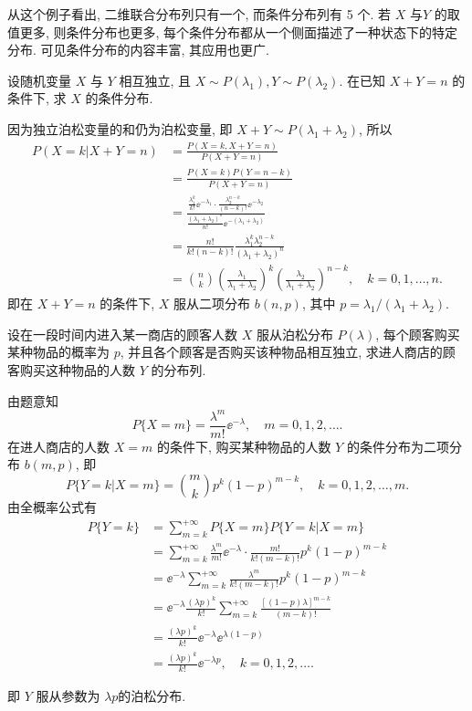 	从这个例子看出, 二维联合分布列只有一个, 而条件分布列有 5 个. 若 $X$ 与$Y$ 的取值更多, 则条件分布也更多, 
	每个条件分布都从一个侧面描述了一种状态下的特定分布. 可见条件分布的内容丰富, 其应用也更广.
	\begin{example}\label{exam:3.5.2}
		设随机变量 $X$ 与 $Y$ 相互独立, 且 $X\sim P(\lambda_1),Y\sim P(\lambda_2)$. 在已知 $X+Y=n$ 的条件下, 求 $X$ 的条件分布.
	\end{example}
	\begin{solution}
		因为独立泊松变量的和仍为泊松变量, 即 $X+Y\sim P(\lambda_1+\lambda_2)$, 所以
		\begin{align*}
			P(X=k | X+Y=n) &=\frac{P(X=k, X+Y=n)}{P(X+Y=n)} \\
			&=\frac{P(X=k) P(Y=n-k)}{P(X+Y=n)} \\
			&=\frac{\frac{\lambda_1^k}{k!}\ee^{-\lambda_1}\cdot\frac{\lambda_2^{n-k}}{(n-k)!}\ee^{-\lambda_2}}
			{\frac{(\lambda_1+\lambda_2)^n}{n!}\ee^{-(\lambda_1+\lambda_2)}}\\
			&=\frac{n!}{k!(n-k)!}\frac{\lambda_1^k\lambda_2^{n-k}}{(\lambda_1+\lambda_2)^n}\\
			&=\binom{n}{k}\left(\frac{\lambda_1}{\lambda_1+\lambda_2}\right)^k
			\left(\frac{\lambda_2}{\lambda_1+\lambda_2}\right)^{n-k},\quad k=0,1,\dots,n.
		\end{align*}
		即在 $X+Y=n$ 的条件下, $X$ 服从二项分布 $b(n,p)$, 其中 $p=\lambda_1/(\lambda_1+\lambda_2)$.
	\end{solution}
	\begin{example}\label{exam:3.5.3}
		设在一段时间内进入某一商店的顾客人数 $X$ 服从泊松分布 $P(\lambda)$, 每个顾客购买某种物品的概率为 $p$, 
		并且各个顾客是否购买该种物品相互独立, 求进人商店的顾客购买这种物品的人数 $Y$ 的分布列.
	\end{example}
	\begin{solution}
		由题意知
		\[
		 	P\{X=m\}=\frac{\lambda^{m}}{m !} \ee^{-\lambda}, \quad m=0,1,2, \dots.
		\]
		在进人商店的人数 $X=m$ 的条件下, 购买某种物品的人数 $Y$ 的条件分布为二项分布 $b(m,p)$, 即
		\[
			P\{ Y=k | X=m \}=\binom{m}{k}p^{k}(1-p)^{m-k}, \quad k=0,1,2, \dots, m.
		\]
		由全概率公式有
		\begin{align*}
			P\{Y=k\} &=\sum_{m=k}^{+\infty} P\{X=m\}P\{Y=k | X=m\}\\
			&=\sum_{m=k}^{+\infty} \frac{\lambda^{m}}{m !} \ee^{-\lambda} \cdot \frac{m !}{k !(m-k) !} p^{k}(1-p)^{m-k} \\
			&=\ee^{-\lambda} \sum_{m=k}^{+\infty} \frac{\lambda^{m}}{k !(m-k) !} p^{k}(1-p)^{m-k}\\
			&=\ee^{-\lambda} \frac{(\lambda p)^{k}}{k !} \sum_{m=k}^{+\infty} \frac{[(1-p) \lambda]^{m-k}}{(m-k) !} \\
			&=\frac{(\lambda p)^{k}}{k !} \ee^{-\lambda} \ee^{\lambda(1-p)} \\
			&=\frac{(\lambda p)^{k}}{k !} \ee^{-\lambda p}, \quad k=0,1,2, \dots. 
		\end{align*}
	\end{solution}
	即 $Y$ 服从参数为 $\lambda p$的泊松分布.

